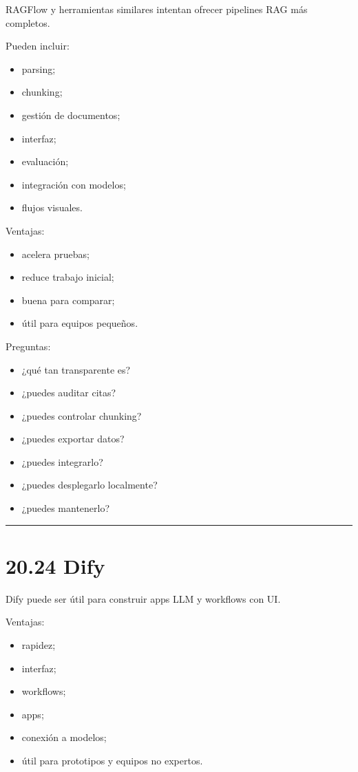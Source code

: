RAGFlow y herramientas similares intentan ofrecer pipelines RAG más
completos.

Pueden incluir:

\begin{itemize}
\tightlist
\item
  parsing;
\item
  chunking;
\item
  gestión de documentos;
\item
  interfaz;
\item
  evaluación;
\item
  integración con modelos;
\item
  flujos visuales.
\end{itemize}

Ventajas:

\begin{itemize}
\tightlist
\item
  acelera pruebas;
\item
  reduce trabajo inicial;
\item
  buena para comparar;
\item
  útil para equipos pequeños.
\end{itemize}

Preguntas:

\begin{itemize}
\tightlist
\item
  ¿qué tan transparente es?
\item
  ¿puedes auditar citas?
\item
  ¿puedes controlar chunking?
\item
  ¿puedes exportar datos?
\item
  ¿puedes integrarlo?
\item
  ¿puedes desplegarlo localmente?
\item
  ¿puedes mantenerlo?
\end{itemize}

\begin{center}\rule{0.5\linewidth}{0.5pt}\end{center}

\section{20.24 Dify}\label{dify}

Dify puede ser útil para construir apps LLM y workflows con UI.

Ventajas:

\begin{itemize}
\tightlist
\item
  rapidez;
\item
  interfaz;
\item
  workflows;
\item
  apps;
\item
  conexión a modelos;
\item
  útil para prototipos y equipos no expertos.
\end{itemize}

